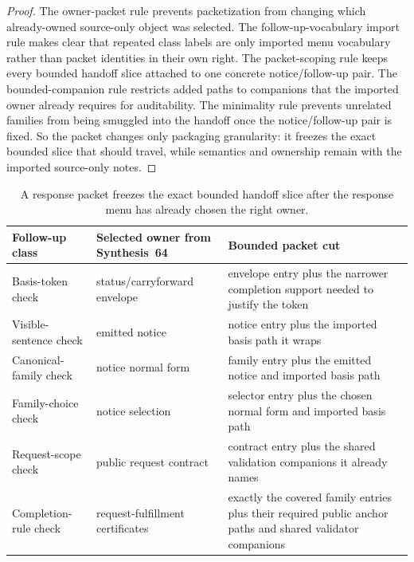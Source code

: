 \documentclass[11pt]{article}
\begin{document}
\begin{proof}
The owner-packet rule prevents packetization from changing which already-owned source-only object was selected.
The follow-up-vocabulary import rule makes clear that repeated class labels are only imported menu vocabulary rather than packet identities in their own right.
The packet-scoping rule keeps every bounded handoff slice attached to one concrete notice/follow-up pair.
The bounded-companion rule restricts added paths to companions that the imported owner already requires for auditability.
The minimality rule prevents unrelated families from being smuggled into the handoff once the notice/follow-up pair is fixed.
So the packet changes only packaging granularity: it freezes the exact bounded slice that should travel, while semantics and ownership remain with the imported source-only notes.\qedhere
\end{proof}

\begin{table}[t]
\centering
\small
\begin{tabularx}{\linewidth}{@{}l l X@{}}
\toprule
Follow-up class & Selected owner from Synthesis~64 & Bounded packet cut \\
\midrule
Basis-token check & status/carryforward envelope & envelope entry plus the narrower completion support needed to justify the token \\
Visible-sentence check & emitted notice & notice entry plus the imported basis path it wraps \\
Canonical-family check & notice normal form & family entry plus the emitted notice and imported basis path \\
Family-choice check & notice selection & selector entry plus the chosen normal form and imported basis path \\
Request-scope check & public request contract & contract entry plus the shared validation companions it already names \\
Completion-rule check & request-fulfillment certificates & exactly the covered family entries plus their required public anchor paths and shared validator companions \\
\bottomrule
\end{tabularx}
\caption{A response packet freezes the exact bounded handoff slice after the response menu has already chosen the right owner.}
\label{tab:publicrequestresponsepacket}
\end{table}
\end{document}
